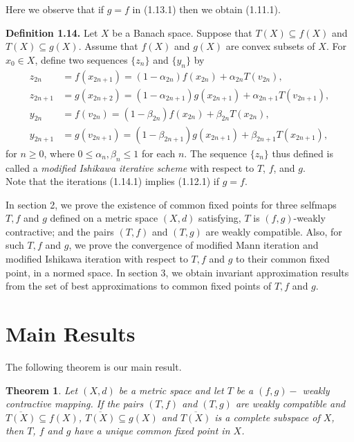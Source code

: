 \documentclass[11]{article}
\newtheorem{theorem}[definition]{Theorem}
\numberwithin{equation}{definition}
\begin{document}
Here we observe that if \(g=f\) in (1.13.1) then we obtain (1.11.1).

\textbf{Definition 1.14.} 
Let \(X\) be a Banach space. Suppose that 
\(T(X) \subseteq f(X)\) and \(T(X) \subseteq g(X)\). 
Assume that \(f(X)\) and \(g(X)\) are convex subsets of \(X\). 
For \(x_{0} \in X\), define two sequences \(\{z_{n}\}\) and \(\{y_{n}\}\) by
\begin{align}
z_{2n}   &= f(x_{2n+1})   = (1 - \alpha_{2n})f(x_{2n})   + \alpha_{2n}T(v_{2n}), \nonumber\\
z_{2n+1} &= g(x_{2n+2})   = (1 - \alpha_{2n+1})g(x_{2n+1}) + \alpha_{2n+1}T(v_{2n+1}), \nonumber\\
y_{2n}   &= f(v_{2n})     = (1 - \beta_{2n})f(x_{2n})     + \beta_{2n}T(x_{2n}), \nonumber\\
y_{2n+1} &= g(v_{2n+1})   = (1 - \beta_{2n+1})g(x_{2n+1}) + \beta_{2n+1}T(x_{2n+1}), \tag{1.14.1}
\end{align}
for \(n \ge 0\), where \(0 \le \alpha_{n}, \beta_{n} \le 1\) for each \(n\).  
The sequence \(\{z_{n}\}\) thus defined is called a \emph{modified Ishikawa iterative scheme} with respect to \(T\), \(f\), and \(g\).\\
Note that the iterations (1.14.1) implies (1.12.1) if \(g=f\).

In section 2, we prove the existence of common fixed points for three selfmaps $T,f$ and $g$ defined on a metric space $(X,d)$ satisfying, $T$ is $(f,g)$-weakly contractive; and the pairs $(T,f)$ and $(T,g)$ are weakly compatible. Also, for such $T,f$ and $g$, we prove the convergence of modified Mann iteration and modified Ishikawa iteration with respect to $T,f$ and $g$ to their common fixed point, in a normed space. In section 3, we obtain invariant approximation results from the set of best approximations to common fixed points of $T,f$ and $g$.

\section{Main Results}

The following theorem is our main result.

\begin{theorem}
Let $(X,d)$ be a metric space and let $T$ be a $(f,g)-$ weakly contractive mapping. If the pairs $(T,f)$ and $(T,g)$ are weakly compatible and $\overline{T(X)}\subseteq f(X)$, $\overline{T(X)}\subseteq g(X)$ and $\overline{T(X)}$ is a complete subspace of $X$, then $T$, $f$ and $g$ have a unique common fixed point in $X$.
\end{theorem}
\end{document}
